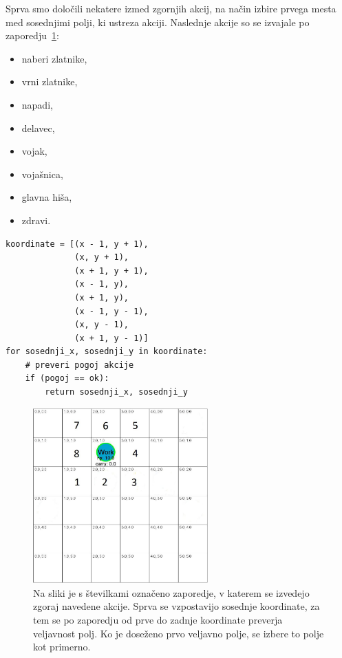 \documentclass[a4paper, 12pt]{book}
\begin{document}
Sprva smo določili nekatere izmed zgornjih akcij, na način izbire prvega mesta med sosednjimi polji, ki ustreza akciji. 
Naslednje akcije so se izvajale po zaporedju~\ref{pickorakiPreverjanja}:
\begin{itemize}
	\item naberi zlatnike,
	\item vrni zlatnike,
	\item napadi,
	\item delavec,
	\item vojak, 
	\item vojašnica,
	\item glavna hiša,
	\item zdravi.
\end{itemize}
\begin{verbatim}
koordinate = [(x - 1, y + 1),
              (x, y + 1),
              (x + 1, y + 1),
              (x - 1, y),
              (x + 1, y),
              (x - 1, y - 1),
              (x, y - 1),
              (x + 1, y - 1)]
for sosednji_x, sosednji_y in koordinate:
    # preveri pogoj akcije
    if (pogoj == ok):
        return sosednji_x, sosednji_y
\end{verbatim}

\begin{figure}[h]
	\begin{center}
		\includegraphics[width=0.6\textwidth]{photos/korakiPreverjanja.pdf}
	\end{center}
	\caption{Na sliki je s številkami označeno zaporedje, v katerem se izvedejo zgoraj navedene akcije. Sprva se vzpostavijo sosednje koordinate, za tem se po zaporedju od prve do zadnje koordinate preverja veljavnost polj. Ko je doseženo prvo veljavno polje, se izbere to polje kot primerno. }
	\label{pickorakiPreverjanja}
\end{figure}
\end{document}

